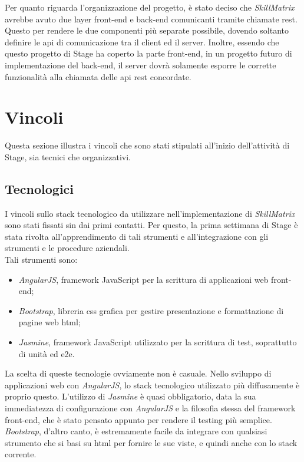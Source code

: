 Per quanto riguarda l'organizzazione del progetto, è stato deciso che \emph{SkillMatrix} avrebbe avuto due layer \gls{front-end} e \gls{back-end} comunicanti tramite chiamate \gls{rest}. Questo per rendere le due componenti più separate possibile, dovendo soltanto definire le \gls{api} di comunicazione tra il client ed il server. Inoltre, essendo che questo progetto di Stage ha coperto la parte \gls{front-end}, in un progetto futuro di implementazione del \gls{back-end}, il server dovrà solamente esporre le corrette funzionalità alla chiamata delle \gls{api} \gls{rest} concordate.





\section{Vincoli}
Questa sezione illustra i vincoli che sono stati stipulati all'inizio dell'attività di Stage, sia tecnici che organizzativi.

\subsection{Tecnologici}
I vincoli sullo stack tecnologico da utilizzare nell'implementazione di \emph{SkillMatrix} sono stati fissati sin dai primi contatti. Per questo, la prima settimana di Stage è stata rivolta all'apprendimento di tali strumenti e all'integrazione con gli strumenti e le procedure aziendali.\\
Tali strumenti sono:
\begin{itemize}
	\item \emph{AngularJS}, framework JavaScript per la scrittura di applicazioni web \gls{front-end};
	\item \emph{Bootstrap}, libreria \gls{css} grafica per gestire presentazione e formattazione di pagine web \gls{html};
	\item \emph{Jasmine}, framework JavaScript utilizzato per la scrittura di test, soprattutto di unità ed \gls{e2e}. 
\end{itemize}
La scelta di queste tecnologie ovviamente non è casuale. Nello sviluppo di applicazioni web con \emph{AngularJS}, lo stack tecnologico utilizzato più diffusamente è proprio questo. L'utilizzo di \emph{Jasmine} è quasi obbligatorio, data la sua immediatezza di configurazione con \emph{AngularJS} e la filosofia stessa del framework \gls{front-end}, che è stato pensato appunto per rendere il testing più semplice.\\
\emph{Bootstrap}, d'altro canto, è estremamente facile da integrare con qualsiasi strumento che si basi su \gls{html} per fornire le sue viste, e quindi anche con lo stack corrente.

